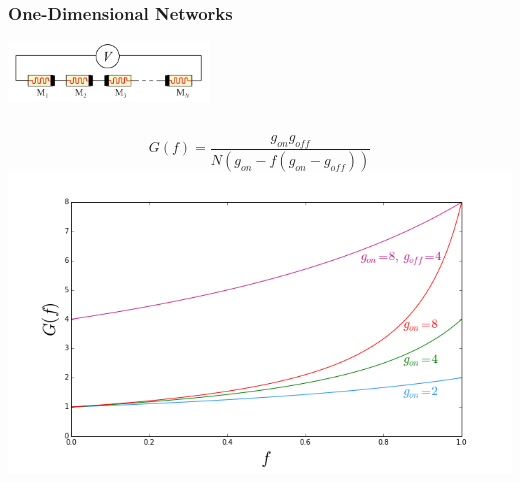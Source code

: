 \documentclass[mathserif]{beamer}
\begin{document}
\begin{frame}
\frametitle{One-Dimensional Networks}
\centering
\includegraphics[width=0.4\textwidth]{1D_memristor_chain.png}

\begin{columns}
$$G(f) = \frac{g_{on}g_{off}}{N(g_{on} - f (g_{on} - g_{off}))}$$
\centering
\includegraphics[width=\textwidth]{1D_Network_Cond.png}


\end{columns}
\end{frame}
\end{document}
